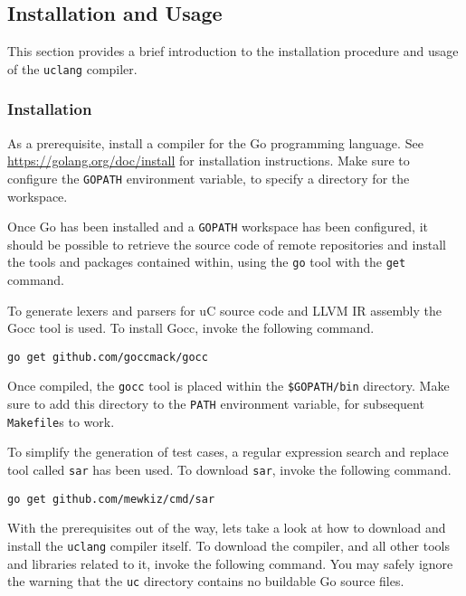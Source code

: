 \subsection{Installation and Usage}
\label{sec:installation_and_usage}

This section provides a brief introduction to the installation procedure and usage of the \texttt{uclang} compiler.

\subsubsection{Installation}

As a prerequisite, install a compiler for the Go programming language. See \url{https://golang.org/doc/install} for installation instructions. Make sure to configure the \texttt{GOPATH} environment variable, to specify a directory for the workspace.

Once Go has been installed and a \texttt{GOPATH} workspace has been configured, it should be possible to retrieve the source code of remote repositories and install the tools and packages contained within, using the \texttt{go} tool with the \texttt{get} command.

To generate lexers and parsers for uC source code and LLVM IR assembly the Gocc tool is used. To install Gocc, invoke the following command.

\begin{verbatim}
go get github.com/goccmack/gocc
\end{verbatim}

Once compiled, the \texttt{gocc} tool is placed within the \verb+$GOPATH/bin+ directory. Make sure to add this directory to the \texttt{PATH} environment variable, for subsequent \texttt{Makefile}s to work.

To simplify the generation of test cases, a regular expression search and replace tool called \texttt{sar} has been used. To download \texttt{sar}, invoke the following command.

\begin{verbatim}
go get github.com/mewkiz/cmd/sar
\end{verbatim}

With the prerequisites out of the way, lets take a look at how to download and install the \texttt{uclang} compiler itself. To download the compiler, and all other tools and libraries related to it, invoke the following command. You may safely ignore the warning that the \texttt{uc} directory contains no buildable Go source files.


